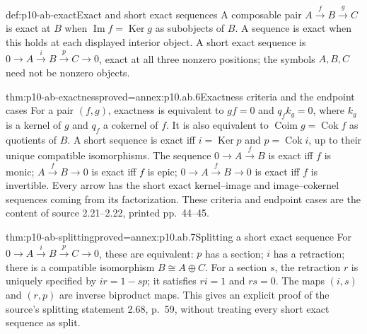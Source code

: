 \begin{hbdefinition}{def:p10-ab-exact}{Exact and short exact sequences}
A composable pair \(A\xrightarrow f B\xrightarrow g C\) is exact
at \(B\) when \(\operatorname{Im}f=\operatorname{Ker}g\) as
subobjects of \(B\). A sequence is exact when this holds at each
displayed interior object. A short exact sequence is
\(0\to A\xrightarrow i B\xrightarrow p C\to0\), exact at all
three nonzero positions; the symbols \(A,B,C\) need not be nonzero objects.
\end{hbdefinition}

\begin{hbtheorem}{thm:p10-ab-exactness}{proved=annex:p10.ab.6}{Exactness criteria and the endpoint cases}
For a pair \((f,g)\), exactness is equivalent to
\(gf=0\) and \(q_f k_g=0\), where \(k_g\) is a kernel of \(g\)
and \(q_f\) a cokernel of \(f\). It is also equivalent to
\(\operatorname{Coim}g=\operatorname{Cok}f\) as quotients of \(B\).
A short sequence is exact iff \(i=\operatorname{Ker}p\) and
\(p=\operatorname{Cok}i\), up to their unique compatible isomorphisms.
The sequence \(0\to A\xrightarrow f B\) is exact iff \(f\) is
monic; \(A\xrightarrow f B\to0\) is exact iff \(f\) is epic;
\(0\to A\xrightarrow f B\to0\) is exact iff \(f\) is invertible.
Every arrow has the short exact kernel--image and image--cokernel
sequences coming from its factorization. These criteria and endpoint
cases are the content of source 2.21--2.22, printed pp.~44--45.
\end{hbtheorem}

\begin{hbtheorem}{thm:p10-ab-splitting}{proved=annex:p10.ab.7}{Splitting a short exact sequence}
For \(0\to A\xrightarrow i B\xrightarrow p C\to0\), these are
equivalent: \(p\) has a section; \(i\) has a retraction; there is a
compatible isomorphism \(B\cong A\oplus C\).
For a section \(s\), the retraction \(r\) is uniquely specified by
\(ir=1-sp\); it satisfies \(ri=1\) and \(rs=0\).
The maps \((i,s)\) and \((r,p)\) are inverse biproduct maps.
This gives an explicit proof of the source's splitting statement 2.68,
p.~59, without treating every short exact sequence as split.
\end{hbtheorem}

